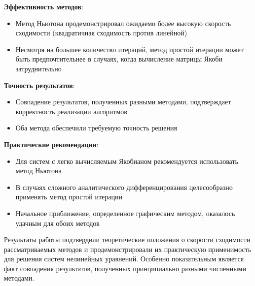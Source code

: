 \textbf{Эффективность методов}:
\begin{itemize}
\item Метод Ньютона продемонстрировал ожидаемо более высокую скорость сходимости (квадратичная сходимость против линейной)
\item Несмотря на большее количество итераций, метод простой итерации может быть предпочтительнее в случаях, когда вычисление матрицы Якоби затруднительно
\end{itemize}

\textbf{Точность результатов}:
\begin{itemize}
\item Совпадение результатов, полученных разными методами, подтверждает корректность реализации алгоритмов
\item Оба метода обеспечили требуемую точность решения
\end{itemize}

\textbf{Практические рекомендации}:
\begin{itemize}
\item Для систем с легко вычисляемым Якобианом рекомендуется использовать метод Ньютона
\item В случаях сложного аналитического дифференцирования целесообразно применять метод простой итерации
\item Начальное приближение, определенное графическим методом, оказалось удачным для обоих методов
\end{itemize}

Результаты работы подтвердили теоретические положения о скорости сходимости рассматриваемых 
методов и продемонстрировали их практическую применимость для решения систем нелинейных уравнений. 
Особенно показательным является факт совпадения результатов, полученных принципиально разными численными методами.

\pagebreak
